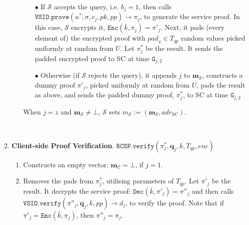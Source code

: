 \begin{enumerate}
\begin{enumerate}
\begin{itemize}
\item[$\bullet$] If $\mathcal S$ accepts the query, i.e. $b_{\scriptscriptstyle j}=1$, then  calls $\mathtt{VSID.prove}(u^{\scriptscriptstyle *},\sigma,c_{\scriptscriptstyle j},pk,{pp})\rightarrow \pi_{\scriptscriptstyle j}$, to generate the service proof. In this case, $\mathcal S$ encrypts it, $\mathtt{Enc}(\bar{k},\pi_{\scriptscriptstyle j})=\pi'_{\scriptscriptstyle j}$. Next, it   pads (every element of) the encrypted proof with ${pad}_{\scriptscriptstyle \pi}\in T_{\scriptscriptstyle qp}$ random values  picked uniformly at random from $U$. Let $\pi^{\scriptscriptstyle *}_{\scriptscriptstyle j}$ be the result. It sends the padded encrypted proof  to SC at time $\texttt{G}_{\scriptscriptstyle j,2}$ 

\item[$\bullet$] Otherwise (if $\mathcal S$ rejects the query), it appends  $j$  to $\bm{m}_{\scriptscriptstyle\mathcal{S}}$,  constructs a dummy proof $\pi'_{\scriptscriptstyle j}$, picked uniformly at random from $U$,  pads the result as above, and sends the padded dummy proof, $\pi^{\scriptscriptstyle *}_{\scriptscriptstyle j}$, to SC at time $\texttt{G}_{\scriptscriptstyle j,2}$ %

\end{itemize}
When $j=z$  and $\bm{m}_{\scriptscriptstyle\mathcal{S}}\neq\bot$, $\mathcal S$ sets    $m_{\scriptscriptstyle\mathcal S}:=(\bm{m}_{\scriptscriptstyle\mathcal{S}},adr_{\scriptscriptstyle \text{SC}})$.

\end{enumerate}

\

\item \textbf{Client-side Proof Verification}.\label{Client-sideProofVerification} $\mathtt{RCSP}.\mathtt{verify}(\pi^{\scriptscriptstyle *}_{\scriptscriptstyle j}, \bm{q}_{\scriptscriptstyle j},k,T_{\scriptscriptstyle qp},enc)$
\begin{enumerate}


\item Constructs an empty vector, $\bm{m}_{\scriptscriptstyle\mathcal C}=\bot$, if $j=1$. 

\item Removes the pads from $\pi^{\scriptscriptstyle *}_{\scriptscriptstyle j}$, utilising  parameters of $T_{\scriptscriptstyle qp}$. Let $\pi'_{\scriptscriptstyle j}$ be the result. It decrypts the service proof: $\mathtt{Dec}(\bar{k},\pi'_{\scriptscriptstyle j})=\pi''_{\scriptscriptstyle j}$ and then calls $\mathtt{VSID.verify}(\pi''_{\scriptscriptstyle j}, \bm{q}_{\scriptscriptstyle j},k, {pp})\rightarrow d_{\scriptscriptstyle j}$, to verify the proof. Note that if $\pi'_{\scriptscriptstyle j}=\mathtt{Enc}(\bar{k},\pi_{\scriptscriptstyle j})$, then $\pi''_{\scriptscriptstyle j}=\pi_{\scriptscriptstyle j}$. 


\end{enumerate}
\end{enumerate}
